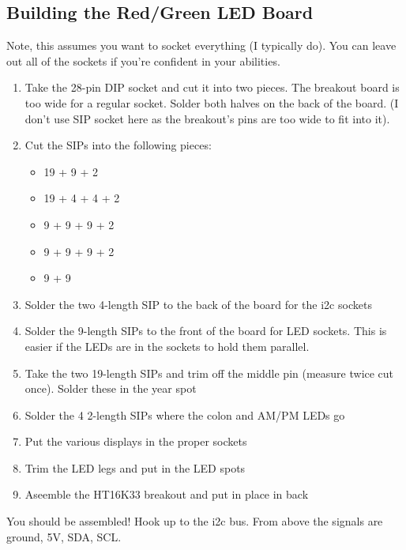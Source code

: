 \documentclass[11pt]{article}
\begin{document}
\subsection{Building the Red/Green LED Board}

Note, this assumes you want to socket everything (I typically do).
You can leave out all of the sockets if you're confident in your
abilities.

\begin{enumerate}
\item Take the 28-pin DIP socket and cut it into two pieces.
      The breakout board is too wide for a regular socket.
      Solder both halves on the back of the board.
      (I don't use SIP socket here as the breakout's pins are too
       wide to fit into it).
\item Cut the SIPs into the following pieces:
\begin{itemize}
\item 19 + 9 + 2
\item 19 + 4 + 4 + 2
\item 9 + 9 + 9 + 2
\item 9 + 9 + 9 + 2
\item 9 + 9
\end{itemize}
\item Solder the two 4-length SIP to the back of the board
      for the i2c sockets
\item Solder the 9-length SIPs to the front of the board for LED
      sockets.  This is easier if the LEDs are in the sockets to
      hold them parallel.
\item Take the two 19-length SIPs and trim off the middle pin
      (measure twice cut once).  Solder these in the year spot
\item Solder the 4 2-length SIPs where the colon and AM/PM LEDs go
\item Put the various displays in the proper sockets
\item Trim the LED legs and put in the LED spots
\item Aseemble the HT16K33 breakout and put in place in back
\end{enumerate}

You should be assembled!  Hook up to the i2c bus.  From above
the signals are ground, 5V, SDA, SCL.
\end{document}
